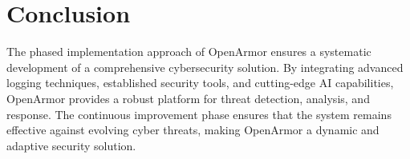 \section{Conclusion}

The phased implementation approach of OpenArmor ensures a systematic development of a comprehensive cybersecurity solution. By integrating advanced logging techniques, established security tools, and cutting-edge AI capabilities, OpenArmor provides a robust platform for threat detection, analysis, and response. The continuous improvement phase ensures that the system remains effective against evolving cyber threats, making OpenArmor a dynamic and adaptive security solution.